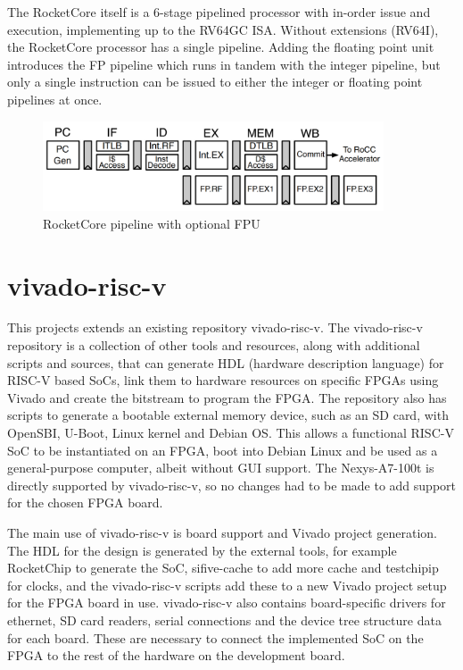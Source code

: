 The RocketCore itself is a 6-stage pipelined processor with in-order issue and execution, implementing up to the RV64GC ISA. Without extensions (RV64I), the RocketCore processor has a single pipeline. Adding the floating point unit introduces the FP pipeline which runs in tandem with the integer pipeline, but only a single instruction can be issued to either the integer or floating point pipelines at once.

\begin{figure}
    \centering
    \includegraphics[width=0.9\textwidth]{img/rocketcore_pipeline.png}
    \caption{RocketCore pipeline with optional FPU\cite{rocketchip}}
    \label{fig:rocketcore_pipeline}
\end{figure}

\section{vivado-risc-v}
\label{vivado-risc-v}
This projects extends an existing repository vivado-risc-v\cite{vivado-risc-v}. The vivado-risc-v repository is a collection of other tools and resources, along with additional scripts and sources, that can generate HDL (hardware description language) for RISC-V based SoCs, link them to hardware resources on specific FPGAs using Vivado and create the bitstream to program the FPGA. The repository also has scripts to generate a bootable external memory device, such as an SD card, with OpenSBI, U-Boot, Linux kernel and Debian OS. This allows a functional RISC-V SoC to be instantiated on an FPGA, boot into Debian Linux and be used as a general-purpose computer, albeit without GUI support. The Nexys-A7-100t is directly supported by vivado-risc-v, so no changes had to be made to add support for the chosen FPGA board.

The main use of vivado-risc-v is board support and Vivado project generation. The HDL for the design is generated by the external tools, for example RocketChip to generate the SoC, sifive-cache to add more cache and testchipip for clocks, and the vivado-risc-v scripts add these to a new Vivado project setup for the FPGA board in use. vivado-risc-v also contains board-specific drivers for ethernet, SD card readers, serial connections and the device tree structure data for each board. These are necessary to connect the implemented SoC on the FPGA to the rest of the hardware on the development board.

